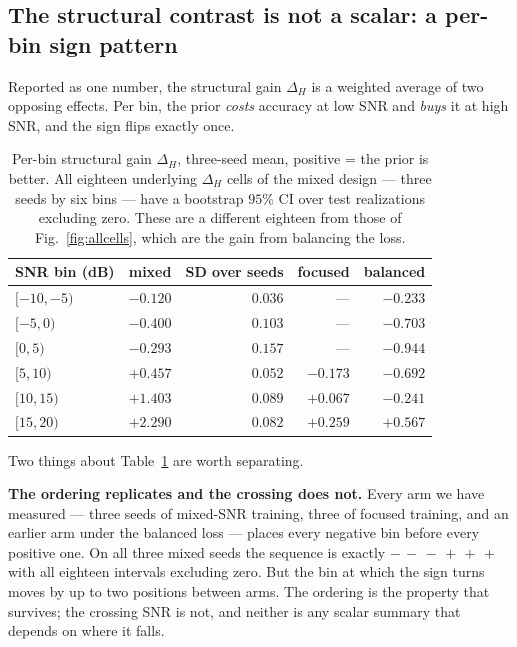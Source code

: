 \documentclass[journal]{IEEEtran}
\begin{document}
\subsection{The structural contrast is not a scalar: a per-bin sign pattern}
\label{sec:signpattern}

Reported as one number, the structural gain $\Delta_H$ is a weighted average of
two opposing effects. Per bin, the prior \emph{costs} accuracy at low SNR and
\emph{buys} it at high SNR, and the sign flips exactly once.

\begin{table}[!t]
\caption{Per-bin structural gain $\Delta_H$, three-seed mean, positive = the
prior is better. All eighteen underlying $\Delta_H$ cells of the mixed design
--- three seeds by six bins --- have a bootstrap $95\%$ CI over test
realizations excluding zero. These are a different eighteen from those of
Fig.~\ref{fig:allcells}, which are the gain from balancing the loss.}
\label{tab:signs}
\centering
\small
\begin{tabular}{lrrrr}
\toprule
SNR bin (dB) & mixed & SD over seeds & focused & balanced \\
\midrule
$[-10,-5)$ & $-0.120$ & $0.036$ & --- & $-0.233$ \\
$[-5,0)$   & $-0.400$ & $0.103$ & --- & $-0.703$ \\
$[0,5)$    & $-0.293$ & $0.157$ & --- & $-0.944$ \\
$[5,10)$   & $+0.457$ & $0.052$ & $-0.173$ & $-0.692$ \\
$[10,15)$  & $+1.403$ & $0.089$ & $+0.067$ & $-0.241$ \\
$[15,20)$  & $+2.290$ & $0.082$ & $+0.259$ & $+0.567$ \\
\bottomrule
\end{tabular}
\end{table}

Two things about Table~\ref{tab:signs} are worth separating.

\textbf{The ordering replicates and the crossing does not.} Every arm we have
measured --- three seeds of mixed-SNR training, three of focused training, and
an earlier arm under the balanced loss --- places every negative bin before
every positive one. On all three mixed seeds the sequence is exactly
$-\,-\,-\,+\,+\,+$ with all eighteen intervals excluding zero. But the bin at
which the sign turns moves by up to two positions between arms. The ordering is
the property that survives; the crossing SNR is not, and neither is any scalar
summary that depends on where it falls.
\end{document}
